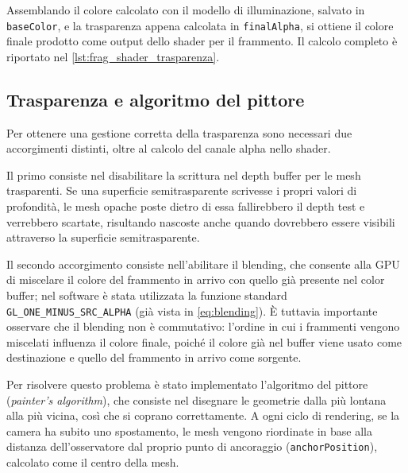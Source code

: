 Assemblando il colore calcolato con il modello di illuminazione, salvato in \texttt{baseColor}, e la trasparenza appena calcolata in \texttt{finalAlpha}, si ottiene il colore finale prodotto come output dello shader per il frammento.
Il calcolo completo è riportato nel \cref{lst:frag_shader_trasparenza}.



\subsection{Trasparenza e algoritmo del pittore}
Per ottenere una gestione corretta della trasparenza sono necessari due accorgimenti distinti, oltre al calcolo del canale alpha nello shader.

Il primo consiste nel disabilitare la scrittura nel depth buffer per le mesh trasparenti.
Se una superficie semitrasparente scrivesse i propri valori di profondità, le mesh opache poste dietro di essa fallirebbero il depth test e verrebbero scartate, risultando nascoste anche quando dovrebbero essere visibili attraverso la superficie semitrasparente.

Il secondo accorgimento consiste nell'abilitare il blending, che consente alla GPU di miscelare il colore del frammento in arrivo con quello già presente nel color buffer; nel software è stata utilizzata la funzione standard \texttt{GL\_ONE\_MINUS\_SRC\_\allowbreak{}ALPHA} (già vista in \cref{eq:blending}).
È tuttavia importante osservare che il blending non è commutativo: l'ordine in cui i frammenti vengono miscelati influenza il colore finale, poiché il colore già nel buffer viene usato come destinazione e quello del frammento in arrivo come sorgente.

Per risolvere questo problema è stato implementato l'algoritmo del pittore (\emph{painter's algorithm}), che consiste nel disegnare le geometrie dalla più lontana alla più vicina, così che si coprano correttamente.
A ogni ciclo di rendering, se la camera ha subito uno spostamento, le mesh vengono riordinate in base alla distanza dell'osservatore dal proprio punto di ancoraggio (\texttt{anchorPosition}), calcolato come il centro della mesh.


